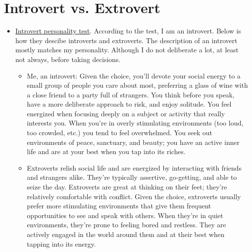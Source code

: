 \documentclass[12pt]{article}
\begin{document}
\section{Introvert vs. Extrovert}
\begin{itemize}
	\item \href{https://www.quietrev.com/the-introvert-test/}{Introvert personality test}. According to the test, I am an introvert. Below is how they descibe introverts and extroverts. The description of an introvert mostly matches my personality. Although I do not deliberate a lot, at least not always, before taking decisions.
	\begin{itemize}
		\item Me, an introvert: Given the choice, you’ll devote your social energy to a small group of people you care about most, preferring a glass of wine with a close friend to a party full of strangers. You think before you speak, have a more deliberate approach to risk, and enjoy solitude. You feel energized when focusing deeply on a subject or activity that really interests you. When you’re in overly stimulating environments (too loud, too crowded, etc.) you tend to feel overwhelmed. You seek out environments of peace, sanctuary, and beauty; you have an active inner life and are at your best when you tap into its riches.
		\item Extroverts relish social life and are energized by interacting with friends and strangers alike. They’re typically assertive, go-getting, and able to seize the day. Extroverts are great at thinking on their feet; they’re relatively comfortable with conflict. Given the choice, extroverts usually prefer more stimulating environments that give them frequent opportunities to see and speak with others. When they’re in quiet environments, they’re prone to feeling bored and restless. They are actively engaged in the world around them and at their best when tapping into its energy.
	\end{itemize}
\end{itemize}
\end{document}
